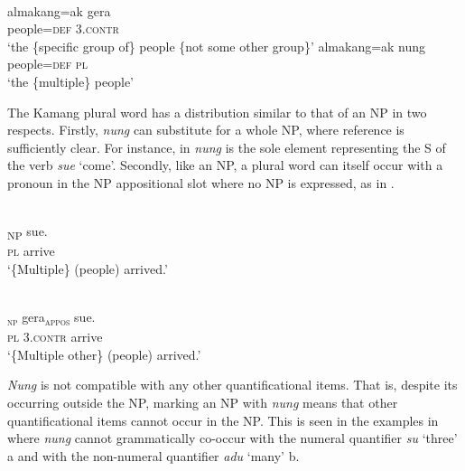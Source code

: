 \ea%
\label{ex:9:36}
 \\
\ea
\gll almakang=ak gera  \\
 people=\textsc{def} \textsc{3.contr}   \\
\glt `the \{specific group of\} people \{not some other group\}'
\ex
\gll almakang=ak nung \\
  people=\textsc{def} \textsc{pl}   \\
\glt  `the \{multiple\} people'
\z
\z






The Kamang plural word has a distribution similar to that of an NP in two respects. Firstly, \textit{nung} can substitute for a whole NP, where reference is sufficiently clear. For instance, in  \textit{nung} is the sole element representing the S of the verb \textit{sue} `come'. Secondly, like an NP, a plural word can itself occur with a pronoun in the NP appositional slot where no NP is expressed, as in .


\ea%
\label{ex:9:37}
 \\
\gll  [Nung]\textsubscript{NP} sue. \\
   \textsc{pl} arrive  \\
\glt `\{Multiple\} (people) arrived.'
\z







\ea%
\label{ex:9:38}
 \\
\gll  [{Nung}]\textsubscript{\textsc{np}} {gera}\textsubscript{\textsc{appos}} sue. \\
   \textsc{pl} \textsc{3.contr} arrive  \\
\glt `\{Multiple other\} (people) arrived.'
\z






\textit{Nung} is not compatible with any other quantificational items. That is, despite its occurring outside the NP, marking an NP with \textit{nung} means that other quantificational items cannot occur in the NP. This is seen in the examples in  where \textit{nung} cannot grammatically co-occur with the numeral quantifier \textit{su} `three' a and with the non-numeral quantifier \textit{adu} `many' b.


